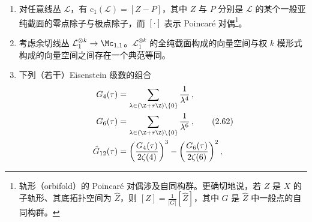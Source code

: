 
\begin{enumerate}[label=(\arabic*),start=2]
\item 对任意线丛 $\mathcal{L}$，有 $\mathrm{c}_1(\mathcal{L})=[Z-P]$，其中 $Z$ 与 $P$ 分别是 $\mathcal{L}$ 的某个一般亚纯截面的零点除子与极点除子，而 $[\cdot]$ 表示 Poincaré 对偶\footnote{轨形（orbifold）的 Poincaré 对偶涉及自同构群。更确切地说，若 $Z$ 是 $X$ 的子轨形、其底拓扑空间为 $\hat Z$，则 $[Z]=\frac{1}{|G|}[\hat Z]$，其中 $G$ 是 $\hat Z$ 中一般点的自同构群。}。
\item 考虑余切线丛 $\mathcal{L}_1^{\otimes k}\to\Mc_{1,1}$。$\mathcal{L}_1^{\otimes k}$ 的全纯截面构成的向量空间与权 $k$ 模形式构成的向量空间之间存在一个典范等同。
\item 下列（若干）Eisenstein 级数的组合
\begin{align}
G_4(\tau) &= \sum_{\lambda\in(\Z+\tau\Z)\setminus\{0\}}\frac{1}{\lambda^4}\,, \nonumber\\
G_6(\tau) &= \sum_{\lambda\in(\Z+\tau\Z)\setminus\{0\}}\frac{1}{\lambda^6}\,, \tag{2.62}\\
\tilde{G}_{12}(\tau) &= \left(\frac{G_4(\tau)}{2\zeta(4)}\right)^{3}-\left(\frac{G_6(\tau)}{2\zeta(6)}\right)^{2}, \nonumber

\end{align}
\end{enumerate}
